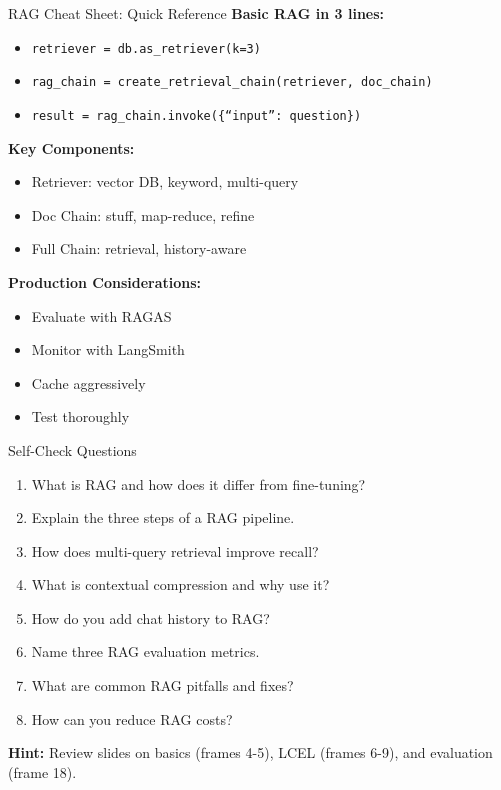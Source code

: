 \documentclass[aspectratio=169,11pt]{beamer}
\begin{document}
\begin{frame}{RAG Cheat Sheet: Quick Reference}
  \textbf{Basic RAG in 3 lines:}
  \begin{itemize}
    \setlength{\itemsep}{1pt}
    \item \texttt{retriever = db.as\_retriever(k=3)}
    \item \texttt{rag\_chain = create\_retrieval\_chain(retriever, doc\_chain)}
    \item \texttt{result = rag\_chain.invoke(\{``input'': question\})}
  \end{itemize}

  \textbf{Key Components:}
  \begin{itemize}
    \setlength{\itemsep}{1pt}
    \item Retriever: vector DB, keyword, multi-query
    \item Doc Chain: stuff, map-reduce, refine
    \item Full Chain: retrieval, history-aware
  \end{itemize}

  \textbf{Production Considerations:}
  \begin{itemize}
    \setlength{\itemsep}{1pt}
    \item Evaluate with RAGAS
    \item Monitor with LangSmith
    \item Cache aggressively
    \item Test thoroughly
  \end{itemize}
\end{frame}

\begin{frame}{Self-Check Questions}
  \begin{enumerate}
    \setlength{\itemsep}{0pt}
    \item What is RAG and how does it differ from fine-tuning?
    \item Explain the three steps of a RAG pipeline.
    \item How does multi-query retrieval improve recall?
    \item What is contextual compression and why use it?
    \item How do you add chat history to RAG?
    \item Name three RAG evaluation metrics.
    \item What are common RAG pitfalls and fixes?
    \item How can you reduce RAG costs?
  \end{enumerate}

  \vspace{0.08cm}
  \textcolor{lcorange}{\textbf{Hint:}} Review slides on basics (frames 4-5), LCEL (frames 6-9), and evaluation (frame 18).
\end{frame}
\end{document}
